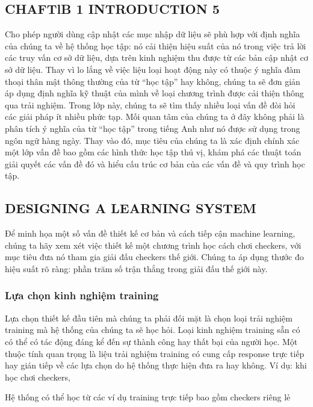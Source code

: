 \subsection{CHAFTlB 1 INTRODUCTION 5}

Cho phép người dùng cập nhật các mục nhập dữ liệu sẽ phù hợp với định nghĩa của chúng ta về hệ thống học tập: nó cải thiện hiệu suất của nó trong việc trả lời các truy vấn cơ sở dữ liệu, dựa trên kinh nghiệm thu được từ các bản cập nhật cơ sở dữ liệu. Thay vì lo lắng về việc liệu loại hoạt động này có thuộc ý nghĩa đàm thoại thân mật thông thường của từ “học tập” hay không, chúng ta sẽ đơn giản áp dụng định nghĩa kỹ thuật của mình về loại chương trình được cải thiện thông qua trải nghiệm. Trong lớp này, chúng ta sẽ tìm thấy nhiều loại vấn đề đòi hỏi các giải pháp ít nhiều phức tạp. Mối quan tâm của chúng ta ở đây không phải là phân tích ý nghĩa của từ “học tập” trong tiếng Anh như nó được sử dụng trong ngôn ngữ hàng ngày. Thay vào đó, mục tiêu của chúng ta là xác định chính xác một lớp vấn đề bao gồm các hình thức học tập thú vị, khám phá các thuật toán giải quyết các vấn đề đó và hiểu cấu trúc cơ bản của các vấn đề và quy trình học tập.

\subsection{DESIGNING A LEARNING SYSTEM}

Để minh họa một số vấn đề thiết kế cơ bản và cách tiếp cận machine learning, chúng ta hãy xem xét việc thiết kế một chương trình học cách chơi checkers, với mục tiêu đưa nó tham gia giải đấu checkers thế giới. Chúng ta áp dụng thước đo hiệu suất rõ ràng: phần trăm số trận thắng trong giải đấu thế giới này.

\subsubsection{Lựa chọn kinh nghiệm training}

Lựa chọn thiết kế đầu tiên mà chúng ta phải đối mặt là chọn loại trải nghiệm training mà hệ thống của chúng ta sẽ học hỏi. Loại kinh nghiệm training sẵn có có thể có tác động đáng kể đến sự thành công hay thất bại của người học. Một thuộc tính quan trọng là liệu trải nghiệm training có cung cấp response trực tiếp hay gián tiếp về các lựa chọn do hệ thống thực hiện đưa ra hay không. Ví dụ: khi học chơi checkers,

Hệ thống có thể học từ các ví dụ training trực tiếp bao gồm checkers riêng lẻ

